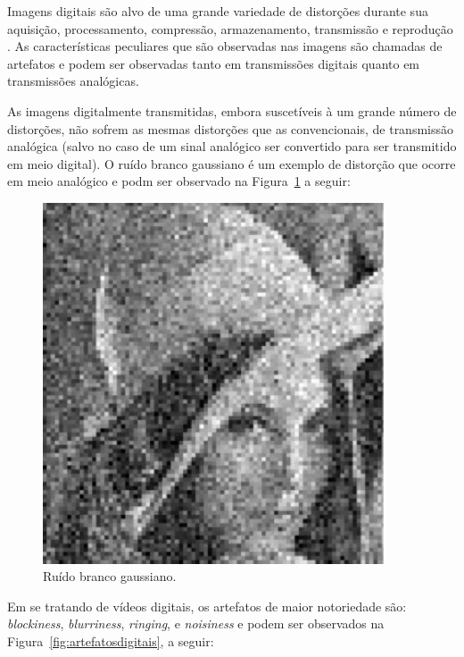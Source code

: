 Imagens digitais são alvo de uma grande variedade de distorções durante sua aquisição, processamento, compressão, armazenamento, transmissão e reprodução \cite{wangbovik2004}. As características peculiares que são observadas nas imagens são chamadas de artefatos \cite{albini} e podem ser observadas tanto em transmissões digitais quanto em transmissões analógicas.

As imagens digitalmente transmitidas, embora suscetíveis à um grande número de distorções, não sofrem as mesmas distorções que as convencionais, de transmissão analógica (salvo no caso de um sinal analógico ser convertido para ser transmitido em meio digital). O ruído branco gaussiano é um exemplo de distorção que ocorre em meio analógico e podm ser observado na Figura~\ref{fig:artefatosanalogicos} a seguir:

\begin{figure}[!htb]
	\centering
	\includegraphics[width=0.9\textwidth]{./imgs/artefatosanalogicos.png}
	\caption{Ruído branco gaussiano.}
	\label{fig:artefatosanalogicos}
\end{figure}

Em se tratando de vídeos digitais, os artefatos de maior notoriedade são: \emph{blockiness}, \emph{blurriness}, \emph{ringing}, e \emph{noisiness} \cite{farias2007} e podem ser observados na Figura~\ref{fig:artefatosdigitais}, a seguir:

